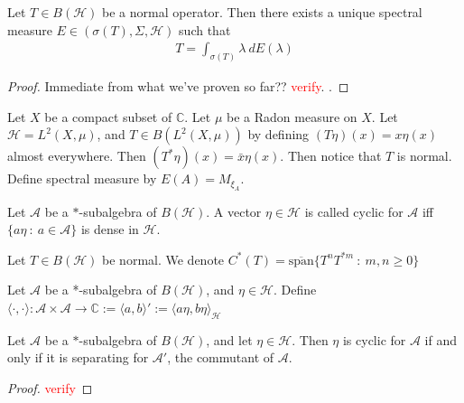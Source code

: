 

\begin{theorem}
  Let $T \in B(\mathcal{H})$ be a normal operator. Then there exists
  a unique spectral measure $E \in (\sigma(T), \Sigma, \mathcal{H})$ such that
  \begin{align*}
    T = \int_{\sigma(T)}  \lambda \ d   E(\lambda)
  \end{align*}
\end{theorem}
\begin{proof}
  Immediate from what we've proven so far?? \textcolor{red}{verify}.
  .
\end{proof}

Let $X$ be a compact subset of $\mathbb{C}$. Let $\mu$ be a Radon
measure on $X$. Let $\mathcal{H} = L^{2}(X, \mu)$, and $T \in
B(L^{2}(X, \mu))$ by defining $(T \eta)(x) = x \eta(x)$ almost
everywhere. Then $(T^* \eta)(x) = \bar{x}\eta(x)$.
Then notice that $T$ is normal. Define spectral measure by $E(A) = M_{\xi_A}$.

\begin{definition}
  Let $\mathcal{A}$ be a $*$-subalgebra of $B(\mathcal{H})$. A vector
  $\eta \in \mathcal{H}$ is called cyclic for $\mathcal{A}$ iff $\{ a
  \eta  \ : \   a \in \mathcal{A} \}$ is dense in $\mathcal{H}$.
\end{definition}

\begin{definition}
  Let $T \in B(\mathcal{H})$ be normal. We denote $C^*(T) =
  \overline{\textrm{span}}\{ T^nT^{*m}  \ : \ m, n \ge 0  \}$
\end{definition}

Let $\mathcal{A}$ be a *-subalgebra of $B(\mathcal{H})$, and $\eta
\in \mathcal{H}$. Define $\langle \cdot , \cdot \rangle :
\mathcal{A} \times \mathcal{A} \to \mathbb{C}:= \langle a , b \rangle'
:= \langle a \eta ,  b \eta \rangle_\mathcal{H}$

\begin{lemma}
  Let $\mathcal{A}$ be a $*$-subalgebra of $B(\mathcal{H})$, and let
  $\eta \in \mathcal{H}$. Then $\eta$ is cyclic for $\mathcal{A}$ if
  and only if it is separating for $\mathcal{A}'$, the commutant of
  $\mathcal{A}$.
\end{lemma}
\begin{proof}
  \textcolor{red}{verify}
\end{proof}

